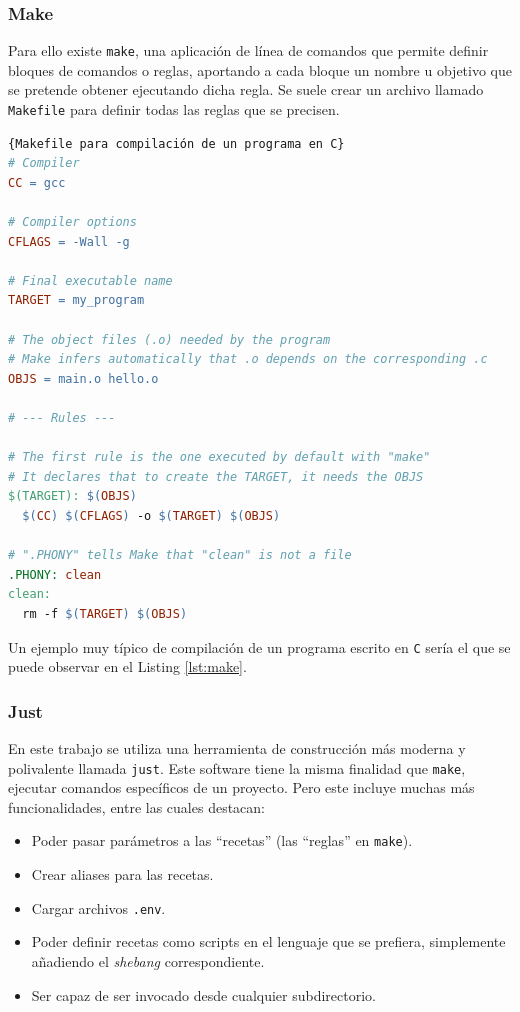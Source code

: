 \subsubsection*{Make}

Para ello existe \texttt{make}\cite{make}, una aplicación de línea de comandos que permite definir bloques de comandos o reglas, aportando a cada bloque un nombre u objetivo que se pretende obtener ejecutando dicha regla. Se suele crear un archivo llamado \texttt{Makefile} para definir todas las reglas que se precisen.

\begin{lstlisting}[language=make,label=lst:make]{Makefile para compilación de un programa en C}
# Compiler
CC = gcc

# Compiler options
CFLAGS = -Wall -g

# Final executable name
TARGET = my_program

# The object files (.o) needed by the program
# Make infers automatically that .o depends on the corresponding .c
OBJS = main.o hello.o

# --- Rules ---

# The first rule is the one executed by default with "make"
# It declares that to create the TARGET, it needs the OBJS
$(TARGET): $(OBJS)
  $(CC) $(CFLAGS) -o $(TARGET) $(OBJS)

# ".PHONY" tells Make that "clean" is not a file
.PHONY: clean
clean:
  rm -f $(TARGET) $(OBJS)
\end{lstlisting}

Un ejemplo muy típico de compilación de un programa escrito en \texttt{C} sería el que se puede observar en el Listing \ref{lst:make}.

\subsubsection*{Just}

En este trabajo se utiliza una herramienta de construcción más moderna y polivalente llamada \texttt{just}\cite{just}. Este software tiene la misma finalidad que \texttt{make}, ejecutar comandos específicos de un proyecto. Pero este incluye muchas más funcionalidades, entre las cuales destacan:

\begin{itemize}
  \item Poder pasar parámetros a las ``recetas'' (las ``reglas'' en \texttt{make}).
  \item Crear aliases para las recetas.
  \item Cargar archivos \texttt{.env}.
  \item Poder definir recetas como scripts en el lenguaje que se prefiera, simplemente añadiendo el \textit{shebang}\cite{shebang} correspondiente.
  \item Ser capaz de ser invocado desde cualquier subdirectorio.
\end{itemize}

